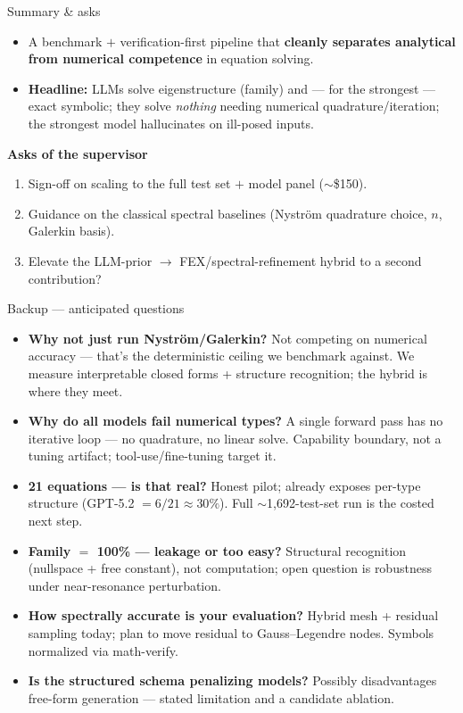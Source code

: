 \documentclass[10pt,aspectratio=169]{beamer}
\begin{document}
\begin{frame}{Summary \& asks}
  \begin{itemize}
    \item A benchmark $+$ verification-first pipeline that \textbf{cleanly separates analytical from
          numerical competence} in equation solving.
    \item \textbf{Headline:} LLMs solve eigenstructure (family) and --- for the strongest --- exact
          symbolic; they solve \emph{nothing} needing numerical quadrature/iteration; the strongest model
          hallucinates on ill-posed inputs.
  \end{itemize}
  \vspace{4pt}
  \textbf{Asks of the supervisor}
  \begin{enumerate}
    \item Sign-off on scaling to the full test set $+$ model panel ($\sim$\$150).
    \item Guidance on the classical spectral baselines (Nystr\"om quadrature choice, $n$, Galerkin basis).
    \item Elevate the LLM-prior $\to$ FEX/spectral-refinement hybrid to a second contribution?
  \end{enumerate}
\end{frame}

\begin{frame}{Backup --- anticipated questions}
  \scriptsize
  \begin{itemize}
    \item \textbf{Why not just run Nystr\"om/Galerkin?} Not competing on numerical accuracy --- that's the
          deterministic ceiling we benchmark against. We measure interpretable closed forms + structure
          recognition; the hybrid is where they meet.
    \item \textbf{Why do all models fail numerical types?} A single forward pass has no iterative loop ---
          no quadrature, no linear solve. Capability boundary, not a tuning artifact; tool-use/fine-tuning target it.
    \item \textbf{21 equations --- is that real?} Honest pilot; already exposes per-type structure
          (GPT-5.2 $=6/21\approx30\%$). Full $\sim$1{,}692-test-set run is the costed next step.
    \item \textbf{Family $=$ 100\% --- leakage or too easy?} Structural recognition (nullspace + free
          constant), not computation; open question is robustness under near-resonance perturbation.
    \item \textbf{How spectrally accurate is your evaluation?} Hybrid mesh + residual sampling today;
          plan to move residual to Gauss--Legendre nodes. Symbols normalized via math-verify.
    \item \textbf{Is the structured schema penalizing models?} Possibly disadvantages free-form generation
          --- stated limitation and a candidate ablation.
  \end{itemize}
\end{frame}
\end{document}

